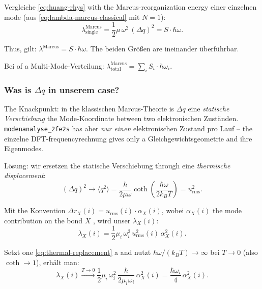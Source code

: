 \documentclass[11pt,a4paper,twoside]{article}
\theoremstyle{remark}
\begin{document}
Vergleiche \eqref{eq:huang-rhys} with the Marcus-reorganization energy
einer einzelnen mode (aus \eqref{eq:lambda-marcus-classical} mit
$N=1$):
\begin{equation}
  \lambda^\text{Marcus}_\text{single} = \frac{1}{2}\mu\,\omega^2\,(\Delta q)^2
  = S \cdot \hbar\omega.
  \label{eq:lambda-vs-S}
\end{equation}

Thus, gilt: \textbf{$\lambda^\text{Marcus} = S \cdot \hbar\omega$}.
The beiden Gr\"o{\ss}en are ineinander \"uberf\"uhrbar.

Bei of a Multi-Mode-Verteilung:
$\lambda^\text{Marcus}_\text{total} = \sum_i S_i \cdot \hbar\omega_i$.

\subsubsection*{Was is $\Delta q$ in unserem case?}

The Knackpunkt: in the klassischen Marcus-Theorie is $\Delta q$ eine
\emph{statische Verschiebung} the Mode-Koordinate between two
elektronischen Zust\"anden. \texttt{modenanalyse\_2fe2s} has aber
\emph{nur einen} elektronischen Zustand pro Lauf -- the einzelne
DFT-frequencyrechnung gives only a Gleichgewichtsgeometrie and ihre
Eigenmodes.

L\"osung: wir ersetzen the statische Verschiebung through eine
\emph{thermische displacement}:
\begin{equation}
  (\Delta q)^2 \to \langle q^2 \rangle = \frac{\hbar}{2\mu\omega}
  \coth\!\left(\frac{\hbar\omega}{2k_BT}\right)
  = u_\text{rms}^2.
  \label{eq:thermal-replacement}
\end{equation}

Mit the Konvention $\Delta r_X(i) = u_\text{rms}(i) \cdot \alpha_X(i)$,
wobei $\alpha_X(i)$ the mode contribution on the bond $X$ , wird
unser $\lambda_X(i)$:
\begin{equation}
  \lambda_X(i) = \frac{1}{2}\mu_i\,\omega_i^2\,
                  u_\text{rms}^2(i)\,\alpha_X^2(i).
\end{equation}

Setzt one \eqref{eq:thermal-replacement} a and nutzt
$\hbar\omega/(k_BT) \to \infty$ bei $T \to 0$ (also $\coth \to 1$),
erh\"alt man:
\begin{equation}
  \lambda_X(i) \xrightarrow{T \to 0}
  \frac{1}{2}\mu_i\,\omega_i^2\,\frac{\hbar}{2\mu_i\omega_i}\,\alpha_X^2(i)
  = \frac{\hbar\omega_i}{4}\,\alpha_X^2(i).
  \label{eq:lambda-zero-T}
\end{equation}
\end{document}
